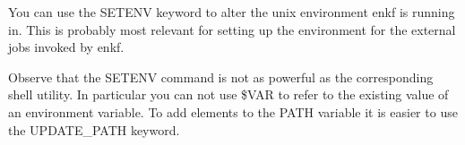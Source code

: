 \documentclass[a4paper,10pt,english]{sphinxmanual}
\begin{document}
\label{\detokenize{keywords/index:setenv}}
\begin{sphinxShadowBox}

You can use the SETENV keyword to alter the unix environment enkf is running
in. This is probably most relevant for setting up the environment for the
external jobs invoked by enkf.


%
\begin{sphinxVerbatim}[commandchars=\\\{\}]
   
        
        
        
     
        
\end{sphinxVerbatim}

Observe that the SETENV command is not as powerful as the corresponding shell
utility. In particular you can not use \$VAR to refer to the existing value of
an environment variable. To add elements to the PATH variable it is easier to
use the UPDATE\_PATH keyword.
\end{sphinxShadowBox}
\label{\detokenize{keywords/index:update-path}}
\end{document}
